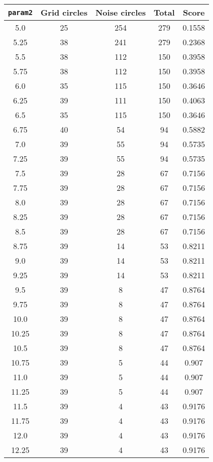 \documentclass[letterpaper, 12pt]{article}
\begin{document}
\begin{longtable}{|c|c|c|c|c|}
\hline
\textbf{\texttt{param2}} & \textbf{Grid circles} & \textbf{Noise circles} & \textbf{Total} & \textbf{Score} \\
\hline
5.0 & 25 & 254 & 279 & 0.1558 \\
\hline
5.25 & 38 & 241 & 279 & 0.2368 \\
\hline
5.5 & 38 & 112 & 150 & 0.3958 \\
\hline
5.75 & 38 & 112 & 150 & 0.3958 \\
\hline
6.0 & 35 & 115 & 150 & 0.3646 \\
\hline
6.25 & 39 & 111 & 150 & 0.4063 \\
\hline
6.5 & 35 & 115 & 150 & 0.3646 \\
\hline
6.75 & 40 & 54 & 94 & 0.5882 \\
\hline
7.0 & 39 & 55 & 94 & 0.5735 \\
\hline
7.25 & 39 & 55 & 94 & 0.5735 \\
\hline
7.5 & 39 & 28 & 67 & 0.7156 \\
\hline
7.75 & 39 & 28 & 67 & 0.7156 \\
\hline
8.0 & 39 & 28 & 67 & 0.7156 \\
\hline
8.25 & 39 & 28 & 67 & 0.7156 \\
\hline
8.5 & 39 & 28 & 67 & 0.7156 \\
\hline
8.75 & 39 & 14 & 53 & 0.8211 \\
\hline
9.0 & 39 & 14 & 53 & 0.8211 \\
\hline
9.25 & 39 & 14 & 53 & 0.8211 \\
\hline
9.5 & 39 & 8 & 47 & 0.8764 \\
\hline
9.75 & 39 & 8 & 47 & 0.8764 \\
\hline
10.0 & 39 & 8 & 47 & 0.8764 \\
\hline
10.25 & 39 & 8 & 47 & 0.8764 \\
\hline
10.5 & 39 & 8 & 47 & 0.8764 \\
\hline
10.75 & 39 & 5 & 44 & 0.907 \\
\hline
11.0 & 39 & 5 & 44 & 0.907 \\
\hline
11.25 & 39 & 5 & 44 & 0.907 \\
\hline
11.5 & 39 & 4 & 43 & 0.9176 \\
\hline
11.75 & 39 & 4 & 43 & 0.9176 \\
\hline
12.0 & 39 & 4 & 43 & 0.9176 \\
\hline
12.25 & 39 & 4 & 43 & 0.9176 \\
\hline

\end{longtable}
\end{document}
